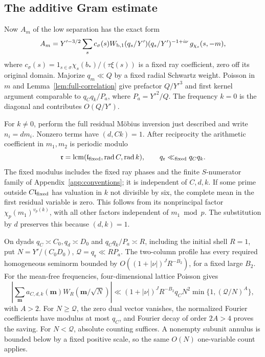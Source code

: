 \documentclass[12pt]{article}
\begin{document}
\subsection{The additive Gram estimate}
Now \(A_m\) of the low separation has the exact form
\[
 A_m=Y'^{-3/2}\sum_s c_\sigma(s)
       W_{\rm b,1}(q_s/Y')(q_s/Y')^{-1+i\nu}\,
                        g_{\chi_s}(s,-m),
\]
where \(c_\sigma(s)=1_{s\in\sigma}\chi_s(b_*)/(\tau\xi(s))\)
is a fixed ray coefficient, zero off its original domain.
Majorize \(q_m\ll Q\) by a fixed radial Schwartz weight.
Poisson in \(m\) and Lemma~\ref{lem:full-correlation} give prefactor \(Q/Y'^3\)
and first kernel argument comparable to \(q_Cq_k/P_a\),
where \(P_a=Y'^2/Q\).
The frequency \(k=0\) is the diagonal and contributes \(O(Q/Y')\).

For \(k\ne0\), perform the full residual M\"obius inversion just
described and write \(n_i=dm_i\).
Nonzero terms have \((d,Ck)=1\).
After reciprocity the arithmetic coefficient in \(m_1,m_2\)
is periodic modulo
\[
 \mathfrak r=\operatorname{lcm}
  (\mathfrak l_{\rm fixed},\operatorname{rad}C,\operatorname{rad}k),
 \qquad q_{\mathfrak r}\ll_{\rm fixed}q_Cq_k .
\]
The fixed modulus includes the fixed ray phases and the finite
\(S\)-numerator family of Appendix~\ref{app:conventions};
it is independent of \(C,d,k\).
If some prime outside \(C\mathfrak l_{\rm fixed}\) has valuation
in \(k\) not divisible by six, the complete mean in the first
residual variable is zero.  This follows from its nonprincipal
factor \(\chi_p(m_1)^{v_p(k)}\), with all other factors independent
of \(m_1\bmod p\).  The substitution by \(d\) preserves this
because \((d,k)=1\).

On dyads \(q_C\asymp C_0,q_d\asymp D_0\) and
\(q_Cq_k/P_a\asymp R\), including the initial shell \(R=1\),
put \(N=Y'/(C_0D_0)\), \(\mathcal Q=q_{\mathfrak r}\ll RP_a\).
The two-column profile has every required homogeneous seminorm
bounded by
\(O((1+|\nu|)^J R^{-B_2})\), for a fixed large \(B_2\).
For the mean-free frequencies, four-dimensional lattice Poisson gives
\[
 \left|\sum_{\mathbf m}a_{C,d,k}(\mathbf m)
                            W_R(\mathbf m/\sqrt N)\right|
 \ll (1+|\nu|)^J R^{-B_2}q_C N^2
                                  \min\{1,(\mathcal Q/N)^A\},
 \tag{C13}
\]
with \(A>2\).
For \(N\ge\mathcal Q\), the zero dual vector vanishes, the
normalized Fourier coefficients have modulus at most \(q_C\),
and Fourier decay of order \(2A>4\) proves the saving.
For \(N<\mathcal Q\), absolute counting suffices.
A nonempty subunit annulus is bounded below by a fixed positive
scale, so the same \(O(N)\) one-variable count applies.
\end{document}
